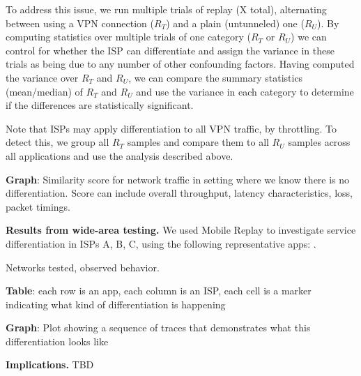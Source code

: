 To address this issue, we run multiple trials of replay (X total), alternating between using a VPN connection ($R_T$) and 
a plain (untunneled) one ($R_U$). By computing statistics over multiple trials of one category ($R_T$ or $R_U$) we 
can control for whether the ISP can differentiate and assign the variance in these trials as being due to 
any number of other confounding factors. Having computed the variance over $R_T$ and $R_U$, we can 
compare the summary statistics (mean/median) of $R_T$ and $R_U$ and use the variance in each category 
to determine if the differences are statistically significant.

Note that ISPs may apply differentiation to all VPN traffic, \eg by throttling. To detect this, we group all $R_T$ 
samples and compare them to all $R_U$ samples across all applications and use the analysis described above. 

\textbf{Graph}: Similarity score for network traffic in setting where we know there is no differentiation. 
Score can include overall throughput, latency characteristics, loss, packet timings.

\noindent\textbf{Results from wide-area testing.} We used Mobile Replay to investigate service differentiation in 
ISPs A, B, C,  using the following representative apps: . 
 
Networks tested, observed behavior.

\textbf{Table}: each row is an app, each column is an ISP, each cell is a marker indicating what kind of 
differentiation is happening

\textbf{Graph}: Plot showing a sequence of traces that demonstrates what this differentiation looks like


\noindent\textbf{Implications.}  TBD 
